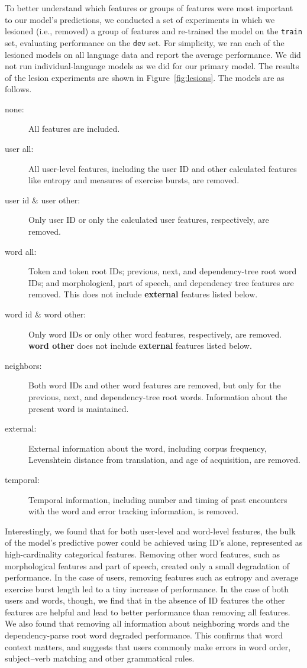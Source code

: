 \documentclass[11pt,a4paper]{article}
\begin{document}
To better understand which features or groups of features were most important to
our model's predictions, we conducted a set of experiments in which we lesioned
(i.e., removed) a group of features and re-trained the model on the {\tt train}
set, evaluating performance on the {\tt dev} set. For simplicity, we ran each of the
lesioned models on all language data and report the average
performance. We did not run individual-language models as we did for our primary model.
The results of the lesion experiments are shown in Figure~\ref{fig:lesions}. The
models are as follows.
\begin{description}
  \item[none:] All features are included.  
  \item[user all:] All user-level features, including the user ID and other
    calculated features like entropy and measures of exercise bursts, are
    removed.
  \item[user id \& user other:] Only user ID or only the calculated
    user features, respectively, are removed.
  \item[word all:] Token and token root IDs; previous, next, and dependency-tree
    root word IDs; and morphological, part of speech, and dependency tree
    features are removed. This does not include {\bf external} features listed below.
  \item[word id \& word other:] Only word IDs or only other
    word features, respectively, are removed. {\bf word other} does not include {\bf external} features listed below.
  \item[neighbors:] Both word IDs and other word features are removed, but
    only for the previous, next, and dependency-tree root words. Information
    about the present word is maintained.
  \item[external:] External information about the word, including corpus
    frequency, Levenshtein distance from translation, and age of acquisition,
    are removed.
  \item[temporal:] Temporal information, including number and timing of
    past encounters with the word and error tracking information, is removed.
\end{description}

Interestingly, we found that for both user-level and word-level features, the
bulk of the model's predictive power could be achieved using ID's alone,
represented as high-cardinality categorical features. Removing other word features,
such as morphological features and part of speech, created only a small
degradation of performance. In the case of users, removing features such as
entropy and average exercise burst length led to a tiny increase of performance.
In the case of both users and words, though, we find that in the absence of ID
features the other features are helpful and lead to better performance than
removing all features. We also found that removing all information about
neighboring words and the dependency-parse root word degraded performance. This
confirms that word context matters, and suggests that users commonly make errors in word order,
subject--verb matching and other grammatical rules.
\end{document}
